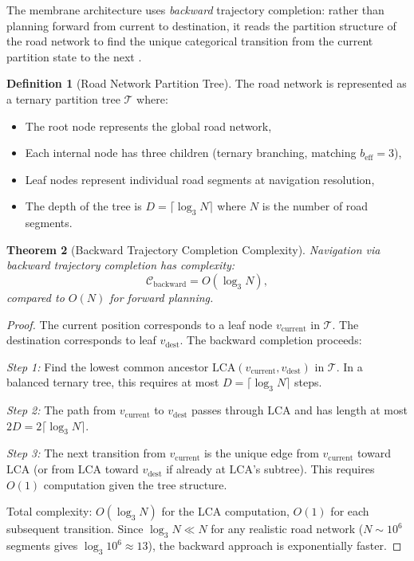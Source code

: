 \documentclass[12pt]{article}
\newtheorem{theorem}{Theorem}[section]
\theoremstyle{definition}
\newtheorem{definition}[theorem]{Definition}
\theoremstyle{remark}
\newcommand{\beff}{b_{\mathrm{eff}}}
\begin{document}
The membrane architecture uses \emph{backward} trajectory completion: rather than planning forward from current to destination, it reads the partition structure of the road network to find the unique categorical transition from the current partition state to the next \cite{sachikonye2026backward, sachikonye2026trajectory}.

\begin{definition}[Road Network Partition Tree]
\label{def:road_tree}
The road network is represented as a ternary partition tree $\mathcal{T}$ where:
\begin{itemize}
  \item The root node represents the global road network,
  \item Each internal node has three children (ternary branching, matching $\beff = 3$),
  \item Leaf nodes represent individual road segments at navigation resolution,
  \item The depth of the tree is $D = \lceil \log_3 N \rceil$ where $N$ is the number of road segments.
\end{itemize}
\end{definition}

\begin{theorem}[Backward Trajectory Completion Complexity]
\label{thm:backward}
Navigation via backward trajectory completion has complexity:
\begin{equation}
  \mathcal{C}_{\mathrm{backward}} = O(\log_3 N),
  \label{eq:backward_complexity}
\end{equation}
compared to $O(N)$ for forward planning.
\end{theorem}

\begin{proof}
The current position corresponds to a leaf node $v_{\mathrm{current}}$ in $\mathcal{T}$. The destination corresponds to leaf $v_{\mathrm{dest}}$. The backward completion proceeds:

\emph{Step 1:} Find the lowest common ancestor $\mathrm{LCA}(v_{\mathrm{current}}, v_{\mathrm{dest}})$ in $\mathcal{T}$. In a balanced ternary tree, this requires at most $D = \lceil\log_3 N\rceil$ steps.

\emph{Step 2:} The path from $v_{\mathrm{current}}$ to $v_{\mathrm{dest}}$ passes through $\mathrm{LCA}$ and has length at most $2D = 2\lceil\log_3 N\rceil$.

\emph{Step 3:} The next transition from $v_{\mathrm{current}}$ is the unique edge from $v_{\mathrm{current}}$ toward $\mathrm{LCA}$ (or from $\mathrm{LCA}$ toward $v_{\mathrm{dest}}$ if already at $\mathrm{LCA}$'s subtree). This requires $O(1)$ computation given the tree structure.

Total complexity: $O(\log_3 N)$ for the LCA computation, $O(1)$ for each subsequent transition. Since $\log_3 N \ll N$ for any realistic road network ($N \sim 10^6$ segments gives $\log_3 10^6 \approx 13$), the backward approach is exponentially faster.
\end{proof}
\end{document}
